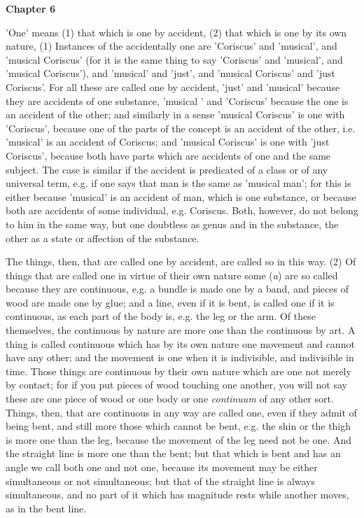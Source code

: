 \textbf{Chapter 6}

'One' means (1) that which is one by accident, (2) that which is one by its own nature, (1) Instances of the accidentally one are 'Coriscus' and 'musical', and 'musical Coriscus' (for it is the same thing to say 'Coriscus' and 'musical', and 'musical Coriscus'), and 'musical' and 'just', and 'musical Coriscus' and 'just Coriscus'. For all these are called one by accident, 'just' and 'musical' because they are accidents of one substance, 'musical ' and 'Coriscus' because the one is an accident of the other; and similarly in a sense 'musical Coriscus' is one with 'Coriscus', because one of the parts of the concept is an accident of the other, i.e. 'musical' is an accident of Coriscus; and 'musical Coriscus' is one with 'just Coriscus', because both have parts which are accidents of
one and the same subject. The case is similar if the accident is predicated of a class or of any universal term, e.g. if one says that man is the same as 'musical man'; for this is either because 'musical' is an accident of man, which is one substance, or because both are accidents of some individual, e.g. Coriscus. Both, however, do not belong to him in the same way, but one doubtless as genus and in the substance, the other as a state or affection of the substance.

The things, then, that are called one by accident, are called so in this way. (2) Of things that are called one in virtue of their own nature some (\emph{a}) are so called because they are continuous, e.g. a bundle is made one by a band, and pieces of wood are made one by glue; and a line, even if it is bent, is called one if it is continuous, as each part of the body is, e.g. the leg or the arm. Of these themselves, the continuous by nature are more one than the continuous by art. A thing is called continuous which has by its own nature one movement and cannot have any other; and the movement is one when it is indivisible, and indivisible in time. Those things are continuous by their own nature which are one not merely by contact; for if you put pieces of wood touching one another, you will not say these are one piece of wood or one body or one \emph{continuum} of any other sort. Things, then, that are continuous in any way are called one, even if they admit of being bent, and still more those which cannot be bent, e.g. the shin or the thigh is more one than the leg, because the movement of the leg need not be one. And the straight line is more one than the bent; but that which is bent and has an angle we call both one and not one, because its movement may be either simultaneous or not simultaneous; but that of the straight line is always simultaneous, and no part of it which has magnitude rests while another moves, as in the bent line.

